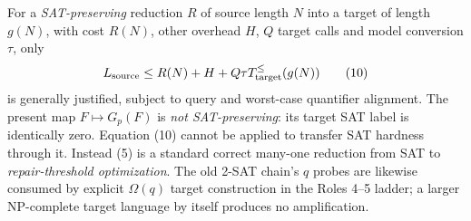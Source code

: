 \documentclass[11pt]{article}
\begin{document}
For a \emph{SAT-preserving} reduction \(R\) of source length \(N\) into a target of length \(g(N)\), with cost \(R(N)\), other overhead \(H\), \(Q\) target calls and model conversion \(\tau\), only
\[
L_{\rm source}\le R(N)+H+Q\tau T_{\rm target}^{\le}(g(N))
\tag{10}
\]
is generally justified, subject to query and worst-case quantifier alignment. The present map \(F\mapsto G_p(F)\) is \emph{not SAT-preserving}: its target SAT label is identically zero. Equation (10) cannot be applied to transfer SAT hardness through it. Instead (5) is a standard correct many-one reduction from SAT to \emph{repair-threshold optimization}. The old 2-SAT chain's \(q\) probes are likewise consumed by explicit \(\Omega(q)\) target construction in the Roles 4--5 ladder; a larger NP-complete target language by itself produces no amplification.
\end{document}
